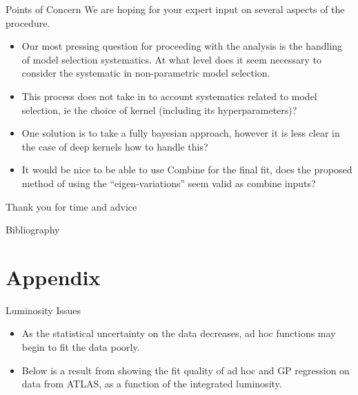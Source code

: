 \documentclass[10pt]{beamer}
\begin{document}
\begin{frame}{Points of Concern}
  We are hoping for your expert input on several aspects of the procedure. 
  \begin{itemize}
  \item Our most pressing question for proceeding with the analysis is the handling of model selection systematics. At what level does it seem necessary to consider the systematic in non-parametric model selection.
  \item This process does not take in to account systematics related to model selection, ie the choice of kernel (including its hyperparameters)?
  \item One solution is to take a fully bayesian approach, however it is less clear in the case of deep kernels how to handle this? 
  \item It would be nice to be able to use Combine for the final fit, does the proposed method of using the ``eigen-variations'' seem valid as combine inputs?
  \end{itemize}
  \begin{center}
    {\Large Thank you for time and advice}
  \end{center}
\end{frame}


\begin{frame}[allowframebreaks]{Bibliography}
  
  
\end{frame}


\appendix

\section{Appendix}
\label{sec:appendix}


\begin{frame}{Luminosity Issues}
  \begin{itemize}
  \item As the statistical uncertainty on the data decreases, ad hoc functions may begin to fit the data poorly. 
  \item Below is a result from \cite{frate_modeling_2017} showing the fit quality of ad hoc and GP regression on data from ATLAS, as a function of the integrated luminosity.
  \end{itemize}
  \begin{center}
  \end{center}
\end{frame}
\end{document}
